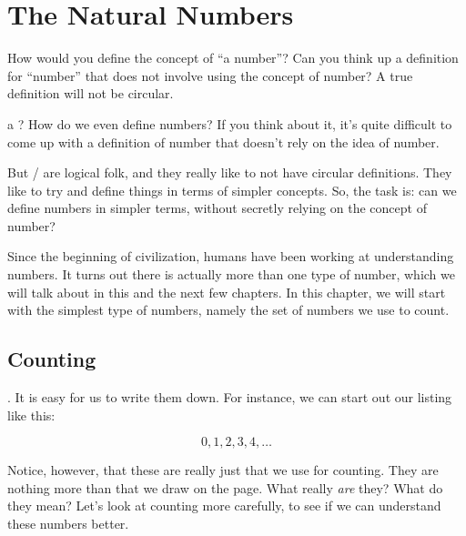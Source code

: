 \documentclass[../../../main.tex]{subfiles}
\begin{document}
\chapter{The Natural Numbers}
\label{ch:natural-numbers}

\begin{ponder}
  How would you define the concept of ``a number''? Can you think up a definition for ``number'' that does not involve using the concept of number? A true definition will not be circular.
\end{ponder}

 a ? How do we even define numbers? If you think about it, it's quite difficult to come up with a definition of number that doesn't rely on the idea of number. 

But \mathers/ are logical folk, and they really like to not have circular definitions. They like to try and define things in terms of simpler concepts. So, the task is: can we define numbers in simpler terms, without secretly relying on the concept of number?

Since the beginning of civilization, humans have been working at understanding numbers. It turns out there is actually more than one type of number, which we will talk about in this and the next few chapters. In this chapter, we will start with the simplest type of numbers, namely the set of numbers we use to count.


\section{Counting}

. It is easy for us to write them down. For instance, we can start out our listing like this:

\begin{equation*}
  0, 1, 2, 3, 4, \ldots
\end{equation*}

Notice, however, that these are really just  that we use for counting. They are nothing more than  that we draw on the page. What really \emph{are} they? What do they mean? Let's look at counting more carefully, to see if we can understand these numbers better.
\end{document}
